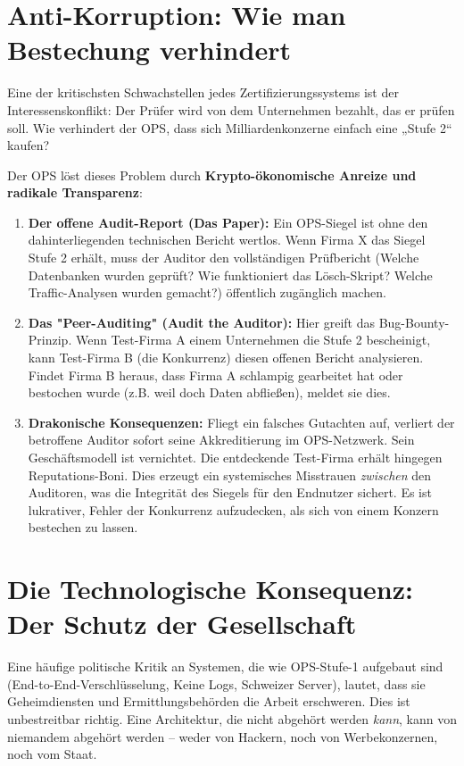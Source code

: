 \documentclass[11pt, a4paper]{article}
\begin{document}
	\section{Anti-Korruption: Wie man Bestechung verhindert}
	
	Eine der kritischsten Schwachstellen jedes Zertifizierungssystems ist der Interessenskonflikt: Der Prüfer wird von dem Unternehmen bezahlt, das er prüfen soll. Wie verhindert der OPS, dass sich Milliardenkonzerne einfach eine „Stufe 2“ kaufen? 
	
	Der OPS löst dieses Problem durch \textbf{Krypto-ökonomische Anreize und radikale Transparenz}:
	
	\begin{enumerate}
		\item \textbf{Der offene Audit-Report (Das Paper):} Ein OPS-Siegel ist ohne den dahinterliegenden technischen Bericht wertlos. Wenn Firma X das Siegel Stufe 2 erhält, muss der Auditor den vollständigen Prüfbericht (Welche Datenbanken wurden geprüft? Wie funktioniert das Lösch-Skript? Welche Traffic-Analysen wurden gemacht?) öffentlich zugänglich machen.
		\item \textbf{Das "Peer-Auditing" (Audit the Auditor):} Hier greift das Bug-Bounty-Prinzip. Wenn Test-Firma A einem Unternehmen die Stufe 2 bescheinigt, kann Test-Firma B (die Konkurrenz) diesen offenen Bericht analysieren. Findet Firma B heraus, dass Firma A schlampig gearbeitet hat oder bestochen wurde (z.B. weil doch Daten abfließen), meldet sie dies. 
		\item \textbf{Drakonische Konsequenzen:} Fliegt ein falsches Gutachten auf, verliert der betroffene Auditor sofort seine Akkreditierung im OPS-Netzwerk. Sein Geschäftsmodell ist vernichtet. Die entdeckende Test-Firma erhält hingegen Reputations-Boni. Dies erzeugt ein systemisches Misstrauen \textit{zwischen} den Auditoren, was die Integrität des Siegels für den Endnutzer sichert. Es ist lukrativer, Fehler der Konkurrenz aufzudecken, als sich von einem Konzern bestechen zu lassen.
	\end{enumerate}
	
	\section{Die Technologische Konsequenz: Der Schutz der Gesellschaft}
	
	Eine häufige politische Kritik an Systemen, die wie OPS-Stufe-1 aufgebaut sind (End-to-End-Verschlüsselung, Keine Logs, Schweizer Server), lautet, dass sie Geheimdiensten und Ermittlungsbehörden die Arbeit erschweren. Dies ist unbestreitbar richtig. Eine Architektur, die nicht abgehört werden \textit{kann}, kann von niemandem abgehört werden – weder von Hackern, noch von Werbekonzernen, noch vom Staat.
	
\end{document}
